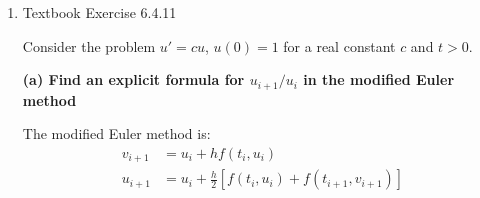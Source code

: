 \documentclass[reqno, answers]{exam}
\begin{document}
\begin{enumerate}
\begin{solution}
          \textit{Step 4: Compute $k_4$}
          \begin{align*}
            k_4 & = f(0 + 0.2, 2 + 0.2 \cdot (-0.392))                    \\
                & = f(0.2, 1.9216) = -2 \cdot 0.2 \cdot 1.9216 = -0.76864
          \end{align*}

          \textit{Step 5: Compute $u_1$}
          \begin{align*}
            u_1 & = u_0 + \frac{h}{6}(k_1 + 2k_2 + 2k_3 + k_4)              \\
                & = 2 + \frac{0.2}{6}(0 + 2(-0.4) + 2(-0.392) + (-0.76864)) \\
                & = 2 + \frac{0.2}{6}(0 - 0.8 - 0.784 - 0.76864)            \\
                & = 2 + \frac{0.2}{6}(-2.35264)                             \\
                & = 2 + \frac{-0.470528}{6}                                 \\
                & = 2 - 0.0784213...                                        \\
                & \approx 1.9216
          \end{align*}

          \textbf{Result:} $\boxed{u_1 \approx 1.9216}$ at $t_1 = 0.2$

          \textit{Comparison with exact solution:}
          \begin{align*}
            \hat{u}(0.2) = 2e^{-(0.2)^2} = 2e^{-0.04} \approx 1.9216
          \end{align*}

          Error: $|u_1 - \hat{u}(0.2)| \approx 0$ (essentially exact to 4 decimal places!)
        \end{solution}
  \item Textbook Exercise 6.4.11
        \begin{solution}
          Consider the problem $u' = cu$, $u(0) = 1$ for a real constant $c$ and $t > 0$.

          \medskip

          \textbf{(a) Find an explicit formula for $u_{i+1}/u_i$ in the modified Euler method}

          The modified Euler method is:
          \begin{align*}
            v_{i+1} & = u_i + h f(t_i, u_i)                                   \\
            u_{i+1} & = u_i + \frac{h}{2} [f(t_i, u_i) + f(t_{i+1}, v_{i+1})]
          \end{align*}


\end{solution}
\end{enumerate}
\end{document}
